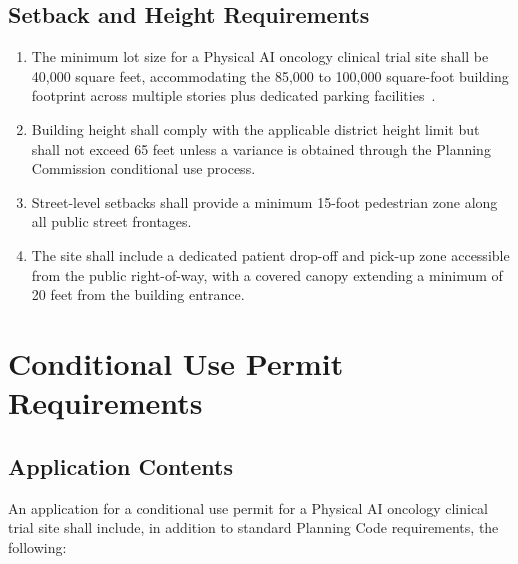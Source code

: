 \documentclass[11pt,letterpaper]{article}
\begin{document}
\subsection{Setback and Height Requirements}

\begin{enumerate}[label=(\alph*)]
\item The minimum lot size for a Physical AI oncology clinical trial site shall
  be 40,000 square feet, accommodating the 85,000 to 100,000 square-foot
  building footprint across multiple stories plus dedicated parking
  facilities~\cite{sitespec2026}.

\item Building height shall comply with the applicable district height limit
  but shall not exceed 65 feet unless a variance is obtained through the
  Planning Commission conditional use process.

\item Street-level setbacks shall provide a minimum 15-foot pedestrian zone
  along all public street frontages.

\item The site shall include a dedicated patient drop-off and pick-up zone
  accessible from the public right-of-way, with a covered canopy extending a
  minimum of 20 feet from the building entrance.
\end{enumerate}

\section{Conditional Use Permit Requirements}

\subsection{Application Contents}

An application for a conditional use permit for a Physical AI oncology clinical
trial site shall include, in addition to standard Planning Code requirements,
the following:
\end{document}
